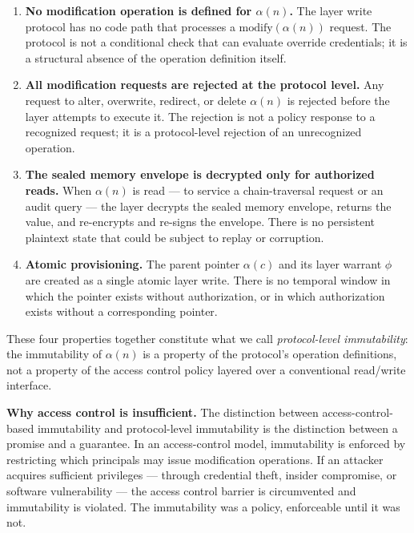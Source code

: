 \begin{enumerate}
    \item[(W1)] \textbf{No modification operation is defined for $\alpha(n)$.} The \fact{} layer write protocol has no code path that processes a $\text{modify}(\alpha(n))$ request. The protocol is not a conditional check that can evaluate override credentials; it is a structural absence of the operation definition itself.
    \item[(W2)] \textbf{All modification requests are rejected at the protocol level.} Any request to alter, overwrite, redirect, or delete $\alpha(n)$ is rejected before the \fact{} layer attempts to execute it. The rejection is not a policy response to a recognized request; it is a protocol-level rejection of an unrecognized operation.
    \item[(W3)] \textbf{The sealed memory envelope is decrypted only for authorized reads.} When $\alpha(n)$ is read --- to service a chain-traversal request or an audit query --- the \fact{} layer decrypts the sealed memory envelope, returns the value, and re-encrypts and re-signs the envelope. There is no persistent plaintext state that could be subject to replay or corruption.
    \item[(W4)] \textbf{Atomic provisioning.} The parent pointer $\alpha(c)$ and its \purpose{} layer warrant $\phi$ are created as a single atomic \fact{} layer write. There is no temporal window in which the pointer exists without authorization, or in which authorization exists without a corresponding pointer.
\end{enumerate}

These four properties together constitute what we call \emph{protocol-level immutability}: the immutability of $\alpha(n)$ is a property of the protocol's operation definitions, not a property of the access control policy layered over a conventional read/write interface.

\medskip
\noindent\textbf{Why access control is insufficient.} The distinction between access-control-based immutability and protocol-level immutability is the distinction between a promise and a guarantee. In an access-control model, immutability is enforced by restricting which principals may issue modification operations. If an attacker acquires sufficient privileges --- through credential theft, insider compromise, or software vulnerability --- the access control barrier is circumvented and immutability is violated. The immutability was a policy, enforceable until it was not.

